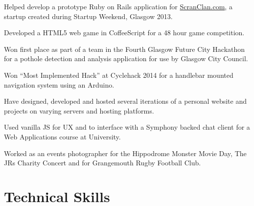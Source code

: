 \documentclass[11pt,a4paper]{article}
\renewenvironment{itemize}{
  \begin{list}{}{
    \setlength{\leftmargin}{1em}
    \setlength{\itemsep}{0.25em}
    \setlength{\parskip}{0pt}
    \setlength{\parsep}{0.25em}
    \renewcommand{\labelitemi}{$\bullet$}
  }
}{
  \end{list}
}
\begin{document}
\begin{itemize}
    \item Helped develop a prototype Ruby on Rails application for \href{http://www.ScranClan.com}{ScranClan.com}, a startup created during Startup Weekend, Glasgow 2013.
    \item Developed a HTML5 web game in CoffeeScript for a 48 hour game
        competition.
    \item Won first place as part of a team in the Fourth Glasgow Future City Hackathon for a pothole detection and analysis application for use by Glasgow City Council.
    \item Won ``Most Implemented Hack'' at Cyclehack 2014 for a handlebar mounted navigation system using an Arduino.
    \item Have designed, developed and hosted several iterations of a personal website and projects on varying servers and hosting platforms.
    \item Used vanilla JS for UX and to interface with a Symphony backed chat client for a Web Applications course at University.
    \item Worked as an events photographer for the Hippodrome Monster Movie Day, The JRs Charity Concert and for Grangemouth Rugby Football Club.
\end{itemize}

\section*{Technical Skills}

\end{document}
